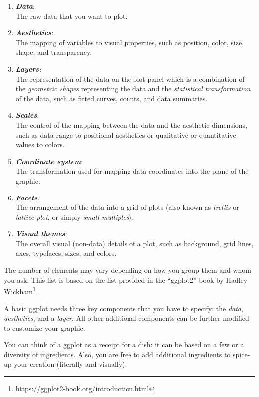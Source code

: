 \documentclass[
]{krantz}
\providecommand{\tightlist}{%
  \setlength{\itemsep}{0pt}\setlength{\parskip}{0pt}}
\renewcommand{\href}[2]{#2\footnote{\url{#1}}}
\begin{document}
\begin{enumerate}
\def\labelenumi{\arabic{enumi}.}
\tightlist
\item
  \textbf{\emph{Data}}:\\
  The raw data that you want to plot.
\item
  \textbf{\emph{Aesthetics}}:\\
  The mapping of variables to visual properties, such as position, color, size, shape, and transparency.
\item
  \textbf{\emph{Layers:}}\\
  The representation of the data on the plot panel which is a combination of the \emph{geometric shapes} representing the data and the \emph{statistical transformation} of the data, such as fitted curves, counts, and data summaries.
\item
  \textbf{\emph{Scales}}:\\
  The control of the mapping between the data and the aesthetic dimensions, such as data range to positional aesthetics or qualitative or quantitative values to colors.
\item
  \textbf{\emph{Coordinate system}}:\\
  The transformation used for mapping data coordinates into the plane of the graphic.
\item
  \textbf{\emph{Facets}}:\\
  The arrangement of the data into a grid of plots (also known as \emph{trellis} or \emph{lattice plot}, or simply \emph{small multiples}).
\item
  \textbf{\emph{Visual themes}}:\\
  The overall visual (non-data) details of a plot, such as background, grid lines, axes, typefaces, sizes, and colors.
\end{enumerate}

The number of elements may vary depending on how you group them and whom you ask. This list is based on the list provided in the \href{https://ggplot2-book.org/introduction.html}{``ggplot2'' book by Hadley Wickham} \citep{ggplot2}.

A basic ggplot needs three key components that you have to specify: the \emph{data}, \emph{aesthetics}, and a \emph{layer}. All other additional components can be further modified to customize your graphic.

You can think of a ggplot as a receipt for a dish: it can be based on a few or a diversity of ingredients. Also, you are free to add additional ingredients to spice-up your creation (literally and visually).
\end{document}
